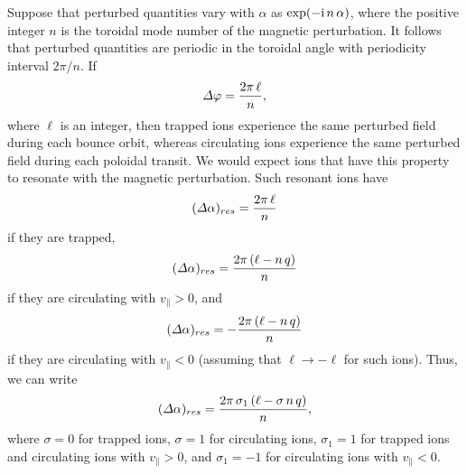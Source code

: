 \documentclass[12pt,prb,aps,notitlepage]{revtex4-1}
\begin{document}
 Suppose that perturbed quantities vary with $\alpha$ as $\exp(-{\rm i}\,n\,\alpha)$, where the positive integer $n$ is the toroidal
 mode number of the magnetic perturbation. It follows that perturbed quantities are periodic in the toroidal angle with periodicity interval $2\pi/n$. If
 \begin{equation}
 {\mit\Delta}\varphi = \frac{2\pi\,\ell}{n},
 \end{equation}
 where $\ell$ is an integer, then trapped ions experience the same perturbed field during each  bounce orbit, whereas circulating
 ions experience the same perturbed field during each poloidal transit.  We would expect ions that have this property to resonate with the
 magnetic perturbation. Such resonant ions have
 \begin{equation}
 ({\mit\Delta}\alpha)_{res} = \frac{2\pi\,\ell}{n}
 \end{equation}
 if they are trapped, 
 \begin{equation}
 ({\mit\Delta}\alpha)_{res} = \frac{2\pi\,(\ell-n\,q)}{n}
 \end{equation}
 if they are circulating with $v_\parallel >0$,
 and 
 \begin{equation}
 ({\mit\Delta}\alpha)_{res} =-\frac{2\pi\,(\ell-n\,q)}{n}
 \end{equation}
 if they are circulating with $v_\parallel <0$ (assuming that $\ell\rightarrow-\ell$ for such ions).
Thus, we can write
  \begin{equation}
 ({\mit\Delta}\alpha)_{res} = \frac{2\pi\,\sigma_1\,(\ell-\sigma\,n\,q)}{n},
 \end{equation}
 where $\sigma=0$ for trapped ions,  $\sigma=1$ for circulating ions, $\sigma_1=1$ for trapped ions and circulating ions with
 $v_\parallel>0$, and $\sigma_1=-1$ for circulating ions with $v_\parallel<0$.   
 
\end{document}
